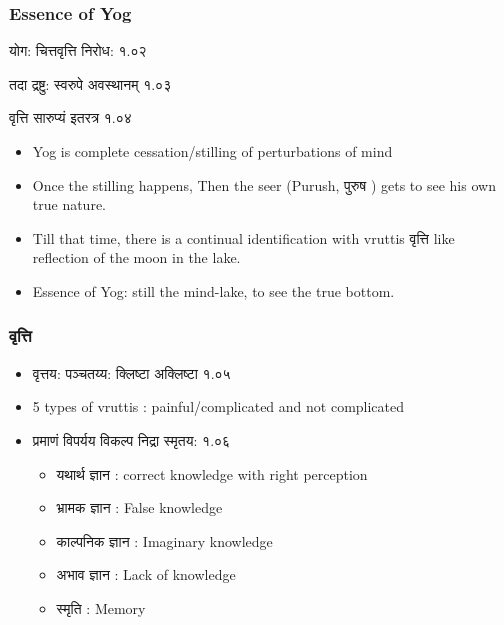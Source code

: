 \begin{frame}[fragile]\frametitle{Essence of Yog}

\begin{sanskrit}
योग: चित्तवृत्ति निरोध: १.०२

तदा द्रष्टु: स्वरुपे अवस्थानम् १.०३

वृत्ति सारुप्यं इतरत्र १.०४
\end{sanskrit}


	\begin{itemize}
	\item Yog is complete cessation/stilling of perturbations of mind
	\item Once the stilling happens, Then the seer (Purush, पुरुष ) gets to see his own true nature.
	\item Till that time, there is a continual identification with vruttis वृत्ति like reflection of the moon in the lake.
	\item Essence of Yog: still the mind-lake, to see the true bottom.
	\end{itemize}

\end{frame}

\begin{frame}[fragile]\frametitle{वृत्ति}

	\begin{itemize}
	\item वृत्तय: पञ्चतय्य: क्लिष्टा अक्लिष्टा १.०५
	\item 5 types of vruttis : painful/complicated and not complicated
	\item प्रमाणं विपर्यय विकल्प निद्रा स्मृतय: १.०६
		\begin{itemize}
		\item यथार्थ ज्ञान : correct knowledge with right perception
		\item भ्रामक ज्ञान : False knowledge
		\item काल्पनिक ज्ञान : Imaginary knowledge
		\item अभाव ज्ञान : Lack of knowledge
		\item स्मृति : Memory
		
		\end{itemize}	
	\end{itemize}

\end{frame}

